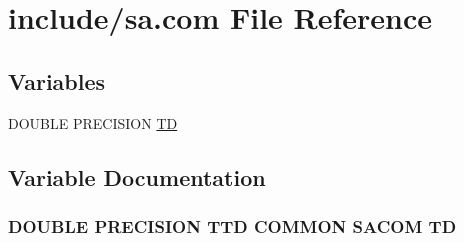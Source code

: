 \hypertarget{sa_8com}{\section{include/sa.com File Reference}
\label{sa_8com}
}
\subsection*{Variables}
\begin{DoxyCompactItemize}
\item 
D\-O\-U\-B\-L\-E P\-R\-E\-C\-I\-S\-I\-O\-N \hyperlink{sa_8com_aaac56f2de1ace407a7ad1003554d2bff}{T\-D}
\end{DoxyCompactItemize}


\subsection{Variable Documentation}
\hypertarget{sa_8com_aaac56f2de1ace407a7ad1003554d2bff}{
\subsubsection[{T\-D}]{\setlength{\rightskip}{0pt plus 5cm}D\-O\-U\-B\-L\-E P\-R\-E\-C\-I\-S\-I\-O\-N T\-T\-D C\-O\-M\-M\-O\-N S\-A\-C\-O\-M T\-D}}\label{sa_8com_aaac56f2de1ace407a7ad1003554d2bff}
